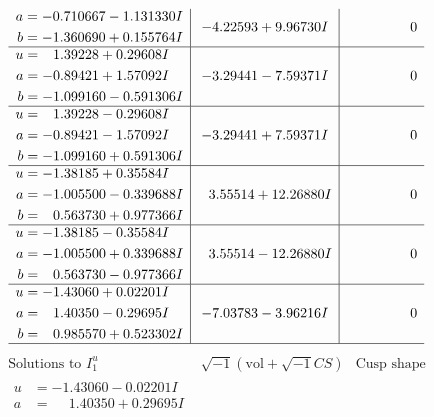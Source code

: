 \documentclass[1p]{elsarticle_modified}
\theoremstyle{definition}
\newcommand{\I}{\sqrt{-1}}
\begin{document}
$$\begin{array}{c|c|c}
\begin{aligned}
a &= -0.710667 - 1.131330 I \\
b &= -1.360690 + 0.155764 I\end{aligned}
 & -4.22593 + 9.96730 I & \phantom{-0.000000 } 0 \\ \hline\begin{aligned}
u &= \phantom{-}1.39228 + 0.29608 I \\
a &= -0.89421 + 1.57092 I \\
b &= -1.099160 - 0.591306 I\end{aligned}
 & -3.29441 - 7.59371 I & \phantom{-0.000000 } 0 \\ \hline\begin{aligned}
u &= \phantom{-}1.39228 - 0.29608 I \\
a &= -0.89421 - 1.57092 I \\
b &= -1.099160 + 0.591306 I\end{aligned}
 & -3.29441 + 7.59371 I & \phantom{-0.000000 } 0 \\ \hline\begin{aligned}
u &= -1.38185 + 0.35584 I \\
a &= -1.005500 - 0.339688 I \\
b &= \phantom{-}0.563730 + 0.977366 I\end{aligned}
 & \phantom{-}3.55514 + 12.26880 I & \phantom{-0.000000 } 0 \\ \hline\begin{aligned}
u &= -1.38185 - 0.35584 I \\
a &= -1.005500 + 0.339688 I \\
b &= \phantom{-}0.563730 - 0.977366 I\end{aligned}
 & \phantom{-}3.55514 - 12.26880 I & \phantom{-0.000000 } 0 \\ \hline\begin{aligned}
u &= -1.43060 + 0.02201 I \\
a &= \phantom{-}1.40350 - 0.29695 I \\
b &= \phantom{-}0.985570 + 0.523302 I\end{aligned}
 & -7.03783 - 3.96216 I & \phantom{-0.000000 } 0\\
 \hline 
 \end{array}$$\newpage$$\begin{array}{c|c|c}  
\text{Solutions to }I^u_{1}& \I (\text{vol} + \sqrt{-1}CS) & \text{Cusp shape}\\
 \hline 
\begin{aligned}
u &= -1.43060 - 0.02201 I \\
a &= \phantom{-}1.40350 + 0.29695 I \\

\end{aligned}
\end{array}$$
\end{document}
